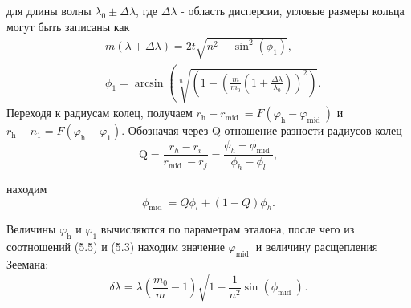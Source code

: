 \documentclass[a4paper, 12pt]{article}%
\begin{document}
	для длины волны $\lambda_0 \pm \Delta \lambda$, где $\Delta \lambda$ - область дисперсии, угловые размеры кольца  могут быть записаны как
	$$
	\begin{aligned}
		& m(\lambda+\Delta \lambda)=2 t \sqrt{n^2-\sin ^2\left(\phi_1\right)}, \\
		& \phi_1=\arcsin \left(\sqrt[n]{\left(1-\left(\frac{m}{m_0}\left(1+\frac{\Delta \lambda}{\lambda_0}\right)\right)^2\right)} .\right.
	\end{aligned}
	$$
	Переходя к радиусам колец, получаем $r_{\mathrm{h}}-r_{\text {mid }}=F\left(\varphi_{\mathrm{h}}-\varphi_{\text {mid }}\right)$ и $r_{\mathrm{h}}-n_1=F\left(\varphi_{\mathrm{h}}-\varphi_1\right)$.
	Обозначая через Q отношение разности радиусов колец
	$$
	\mathrm{Q}=\frac{r_h-r_i}{r_{\text {mid }}-r_j}=\frac{\phi_h-\phi_{\text {mid }}}{\phi_h-\phi_l},
	$$
	
	находим
	$$
	\phi_{\text {mid }}=Q \phi_l+(1-Q) \phi_h .
	$$
	
	Величины $\varphi_{\mathrm{h}}$ и $\varphi_1$ вычисляются по параметрам эталона, после чего из соотношений (5.5) и (5.3) находим значение $\varphi_{\text {mid }}$ и величину расщепления Зеемана:
	$$
	\delta \lambda=\lambda\left(\frac{m_0}{m}-1\right) \sqrt{1-\frac{1}{n^2} \sin \left(\phi_{\text {mid }}\right)} .
	$$
	
\end{document}

